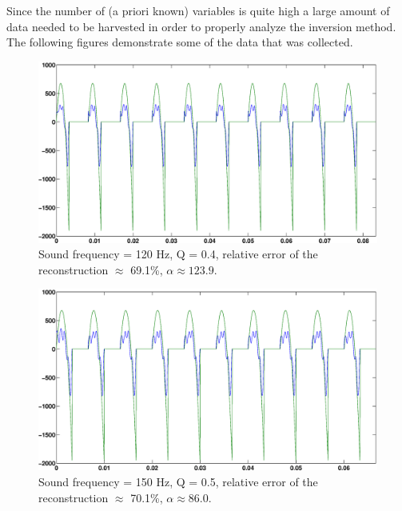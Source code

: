 \documentclass[12pt,a4]{article}
\begin{document}
Since the number of (a priori known) variables is quite high a large amount of data needed to be harvested in order to properly analyze the inversion method. The following figures demonstrate some of the data that was collected.
\begin{figure}[H]
\begin{center}
\includegraphics[scale=.3]{img/morozov_no-crime_error-005_Qrand-0.eps}
\end{center}
\caption{Sound frequency = 120 Hz, Q = 0.4, relative error of the reconstruction $\approx$ 69.1\%, $\alpha \approx 123.9$.}
\label{fig:tik-1}
\end{figure}
\begin{figure}[H]
\begin{center}
\includegraphics[scale=.3]{img/morozov_no-crime_error-005_Qrand-0[V2].eps}
\end{center}
\caption{Sound frequency = 150 Hz, Q = 0.5, relative error of the reconstruction $\approx$ 70.1\%, $\alpha \approx 86.0$.}
\label{fig:tik-2}
\end{figure}
\end{document}
